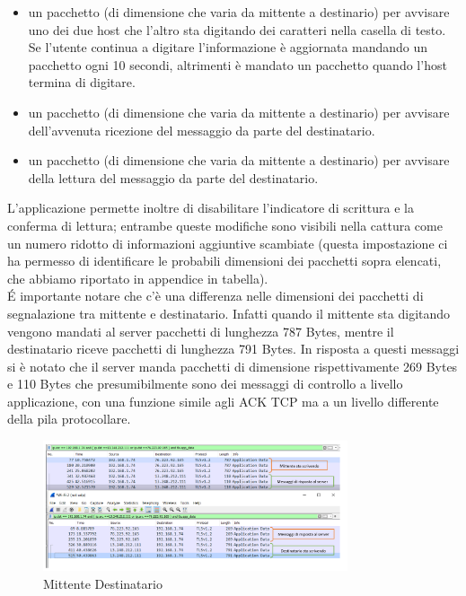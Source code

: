 \documentclass{article}
\begin{document}
\begin{itemize}
  \item un pacchetto (di dimensione che varia da mittente a destinario) per avvisare uno dei due host che l'altro sta digitando dei caratteri nella casella di testo. 
  Se l'utente continua a digitare l'informazione è aggiornata mandando un pacchetto ogni 10 secondi, altrimenti è mandato un pacchetto 
  quando l'host termina di digitare. 
  \item un pacchetto (di dimensione che varia da mittente a destinario) per avvisare dell'avvenuta ricezione del messaggio da parte del destinatario.
  \item un pacchetto (di dimensione che varia da mittente a destinario) per avvisare della lettura del messaggio da parte del destinatario. 

\end{itemize}

L'applicazione permette inoltre di disabilitare l'indicatore di scrittura e la conferma di lettura; entrambe queste modifiche sono 
visibili nella cattura come un numero ridotto di informazioni aggiuntive scambiate (questa impostazione ci ha permesso di 
identificare le probabili dimensioni dei pacchetti sopra elencati, che abbiamo riportato in appendice in tabella).
\\
\'E importante notare che c'è una differenza nelle dimensioni dei pacchetti di segnalazione tra mittente e destinatario.
Infatti quando il mittente sta digitando vengono mandati al server pacchetti di lunghezza 787 Bytes, mentre il destinatario 
riceve pacchetti di lunghezza 791 Bytes. In risposta a questi messaggi si è notato che il server manda pacchetti di dimensione 
rispettivamente 269 Bytes e 110 Bytes che presumibilmente sono dei messaggi di controllo a livello applicazione, con una funzione
simile agli ACK TCP ma a un livello differente della pila protocollare.

\begin{figure}[h]
  \centering
\includegraphics[width=0.8\textwidth]{mittDest.png}
\vspace{-20pt}
\caption{Mittente Destinatario}\label{mitDest}
\vspace{-20pt}
\end{figure}
\end{document}
